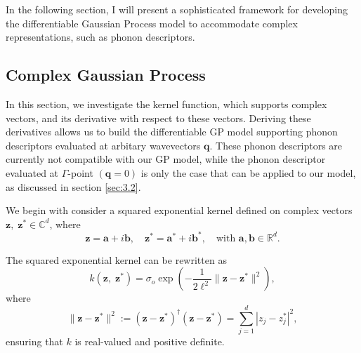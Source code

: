 In the following section, I will present a sophisticated framework for developing the differentiable Gaussian Process model to accommodate complex representations, such as phonon descriptors.


\newpage
\subsection{Complex Gaussian Process} \label{sec:A.1.2}
In this section, we investigate the kernel function, which supports complex vectors, and its derivative with respect to these vectors.
Deriving these derivatives allows us to build the differentiable GP model supporting phonon descriptors evaluated at arbitary wavevectors $\mathbf{q}$. 
These phonon descriptors are currently not compatible with our GP model, while the phonon descriptor evaluated at $\Gamma$-point $(\mathbf{q}=0)$ is only the case that can be applied to our model, as discussed in section \ref{sec:3.2}.

We begin with consider a squared exponential kernel defined on complex vectors \(\mathbf{z},\;\mathbf{z}^* \in \mathbb{C}^d\), where
\[
\mathbf{z} = \mathbf{a} + i \mathbf{b}, \quad \mathbf{z}^* = \mathbf{a}^* + i \mathbf{b}^*, \quad \text{with } \mathbf{a}, \mathbf{b} \in \mathbb{R}^d.
\]

The squared exponential kernel can be rewritten as
\begin{equation} \label{equ:A.19}
    k(\mathbf{z},\;\mathbf{z}^*) = \sigma_{o} \exp\left( -\frac{1}{2\ell^2} \|\mathbf{z} - \mathbf{z}^*\|^2 \right),
\end{equation}
where
\[
\|\mathbf{z} - \mathbf{z}^*\|^2 := (\mathbf{z} - \mathbf{z}^*)^\dagger (\mathbf{z} - \mathbf{z}^*) = \sum_{j=1}^d |z_j - z_j^*|^2,
\]
ensuring that \(k\) is real-valued and positive definite.

